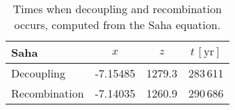 \begin{table}[h]
\centering
\caption{Times when decoupling and recombination occurs, computed from the Saha equation.}
\label{tab:M2:results:rec_and_dec_time_table_Saha}
\begin{tabular}{l|ccc}
\toprule
         Saha &      $x$ &    $z$ & $t\,\mathrm{[yr]}$ \\
\midrule
   Decoupling & -7.15485 & 1279.3 &           283\,611 \\
Recombination & -7.14035 & 1260.9 &           290\,686 \\
\bottomrule
\end{tabular}
\end{table}
